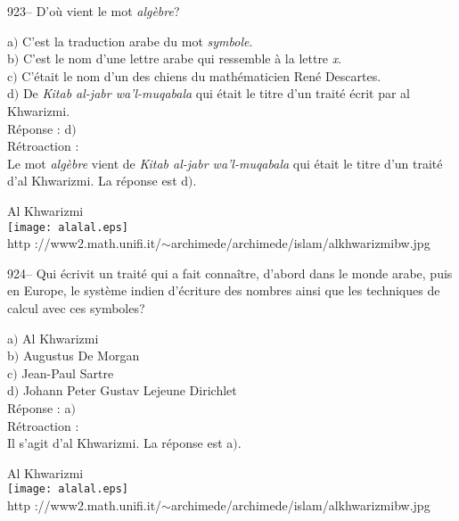 ﻿\documentclass[letterpaper, 12pt]{article}
\begin{document}
923-- D'o\`u vient le mot {\sl alg\`ebre}?

a$)$ C'est la traduction arabe du mot {\sl symbole}. \\
b$)$ C'est le nom d'une lettre arabe qui ressemble \`a la lettre {\sl x}. \\
c$)$ C'\'etait le nom d'un des chiens du math\'ematicien Ren\'e Descartes.
\\
d$)$ De {\sl Kitab al-jabr wa'l-muqabala} qui \'etait le titre d'un trait\'e
\'ecrit par al Khwarizmi. \\

R\'eponse : d$)$\\

R\'etroaction : \\
Le mot {\sl alg\`ebre} vient de {\sl Kitab al-jabr wa'l-muqabala} qui
\'etait le titre d'un trait\'e d'al Khwarizmi. La r\'eponse est d$)$.\\

        \begin{center}
        Al Khwarizmi\\
    \texttt{[image: alalal.eps]}\\
        {\footnotesize http
://www2.math.unifi.it/$\sim$archimede/archimede/islam/alkhwarizmibw.jpg}
    \end{center}

924-- Qui \'ecrivit un trait\'e qui a fait conna\^itre, d'abord dans
le monde arabe, puis en Europe, le syst\`eme indien d'\'ecriture des
nombres ainsi que les techniques de calcul avec ces symboles?

a$)$ Al Khwarizmi \\
b$)$ Augustus De Morgan \\
c$)$ Jean-Paul Sartre \\
d$)$ Johann Peter Gustav Lejeune Dirichlet\\

R\'eponse : a$)$\\

R\'etroaction :\\
Il s'agit d'al Khwarizmi. La r\'eponse est a$)$.\\

        \begin{center}
        Al Khwarizmi\\
    \texttt{[image: alalal.eps]}\\
        {\footnotesize http
://www2.math.unifi.it/$\sim$archimede/archimede/islam/alkhwarizmibw.jpg}
    \end{center}
\end{document}
